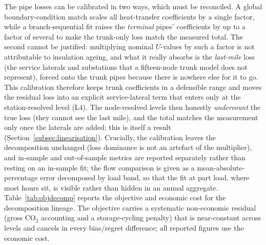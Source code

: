 \documentclass[a4paper,fleqn]{cas-sc}
\begin{document}
The pipe losses can be calibrated in two ways, which must be reconciled. A global
boundary-condition match scales all heat-transfer coefficients by a single factor, while a
branch-sequential fit raises the \emph{terminal} pipes' coefficients by up to a factor of
several to make the trunk-only loss match the measured total. The second cannot be justified:
multiplying nominal $U$-values by such a factor is not attributable to
insulation ageing, and what it really absorbs is the \emph{last-mile} loss (the service
laterals and substations that a fifteen-node trunk model does not represent), forced onto the
trunk pipes because there is nowhere else for it to go. This calibration therefore keeps trunk
coefficients in a defensible range and moves
the residual loss into an explicit service-lateral term that enters only at the station-resolved
level (L4). The node-resolved levels then honestly \emph{undercount} the true loss (they cannot
see the last mile), and the total matches the measurement only once the laterals are added; this
is itself a result (Section~\ref{subsec:linearisation}). Crucially, the calibration leaves
the decomposition unchanged (loss dominance is not an artefact of the multiplier), and
in-sample and out-of-sample metrics are reported separately rather than resting on an
in-sample fit; the flow comparison is given as a mean-absolute-percentage error
decomposed by load band, so that the fit at part load, where most hours sit, is visible
rather than hidden in an annual aggregate.
Table~\ref{tab:objdecomp} reports the objective and economic cost for the decomposition lineage.
The objective carries a systematic non-economic residual (gross CO$_2$ accounting and a
storage-cycling penalty) that is near-constant across levels and cancels in every bias/regret
difference; all reported figures use the economic cost.


\end{document}
